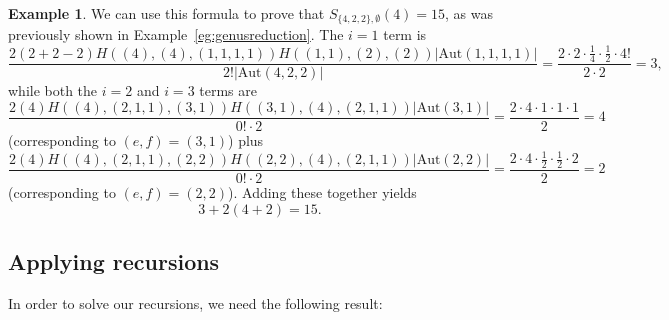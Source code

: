 \documentclass[11pt]{article}           %
\newcommand{\Aut}{\text{Aut}}
\theoremstyle{definition}
\newtheorem{eg}[thm]{Example}
\begin{document}
\begin{eg}
  We can use this formula to prove that $S_{\{4,2,2\},\emptyset}(4)=15$, as was previously shown in
  Example~\ref{eg:genusreduction}.
  The $i=1$ term is
  \[
  \frac{2(2+2-2)H((4),(4),(1,1,1,1))H((1,1),(2),(2))|\Aut(1,1,1,1)|}{2!|\Aut(4,2,2)|} =\frac{2\cdot 2\cdot \frac 14\cdot \frac 12\cdot 4!}{2\cdot 2}=3,
  \]
  while both the $i=2$ and $i=3$ terms are
  \[
  \frac{2(4)H((4),(2,1,1),(3,1))H((3,1),(4),(2,1,1))|\Aut(3,1)|}{0!\cdot 2}=\frac{2\cdot 4\cdot 1\cdot 1\cdot 1}{2}=4
  \]
  (corresponding to $(e,f)=(3,1)$) plus
  \[
  \frac{2(4)H((4),(2,1,1),(2,2))H((2,2),(4),(2,1,1))|\Aut(2,2)|}{0!\cdot 2}=\frac{2\cdot 4\cdot \frac 12\cdot \frac 12\cdot 2}{2}=2
  \]
  (corresponding to $(e,f)=(2,2)$). Adding these together yields
  \[
  3+2(4+2)=15.
  \]
  \end{eg}

\subsection{Applying recursions}

In order to solve our recursions, we need the following result:
\end{document}
